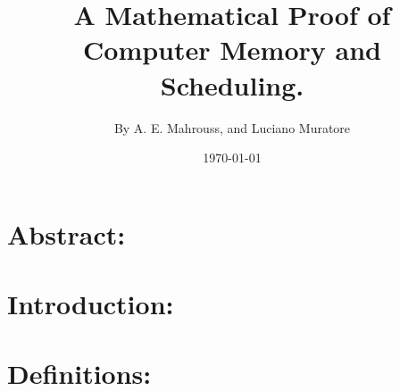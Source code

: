 \documentclass[10pt]{article}
\title{%
	\vspace{-1.5em}%
	\large\textbf{A Mathematical Proof of Computer Memory and Scheduling.}%
}
\author{By A. E. Mahrouss, and Luciano Muratore}
\date{\today}
\theoremstyle{plain}
\theoremstyle{definition}
\theoremstyle{remark}
\begin{document}
	
	\maketitle
	\tableofcontents
	\newpage

\section{Abstract:}
	
\section{Introduction:}

\section{Definitions:}

\nocite{*}


\end{document}
